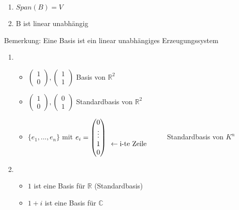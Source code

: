 \documentclass{../tudscript}
\begin{document}
\begin{enumerate}
\def\labelenumi{\arabic{enumi}.}
\tightlist
\item
  \(Span(B) = V\)
\item
  B ist linear unabhängig
\end{enumerate}

Bemerkung: Eine Basis ist ein linear unabhängiges Erzeugungssystem

\hypertarget{beispiel-4}{%
\label{beispiel-4}}

\begin{enumerate}
\def\labelenumi{\arabic{enumi}.}
\item
  \begin{itemize}
  \tightlist
  \item
    \(\begin{pmatrix}1\\0\end{pmatrix}, \begin{pmatrix}1\\1\end{pmatrix}\)
    Basis von \(\mathbb{R}^2\)
  \item
    \(\begin{pmatrix}1\\0\end{pmatrix}, \begin{pmatrix}0\\1\end{pmatrix}\)
    Standardbasis von \(\mathbb{R}^2\)
  \item
    \(\{e_1, ..., e_n\}\) mit
    \(e_i = \begin{pmatrix}0 \\ \vdots \\ 1 \\ 0\end{pmatrix} \begin{array}{l}  \vphantom{0}\\  \vphantom{\vdots}\\  \leftarrow \text{i-te Zeile}\\  \hphantom{0} \end{array} \qquad\)
    Standardbasis von \(K^n\)
  \end{itemize}
\item
  \begin{itemize}
  \tightlist
  \item
    \(1\) ist eine Basis für \(\mathbb{R}\) (Standardbasis)
  \item
    \(1 + i\) ist eine Basis für \(\mathbb{C}\)

\end{itemize}
\end{enumerate}
\end{document}
